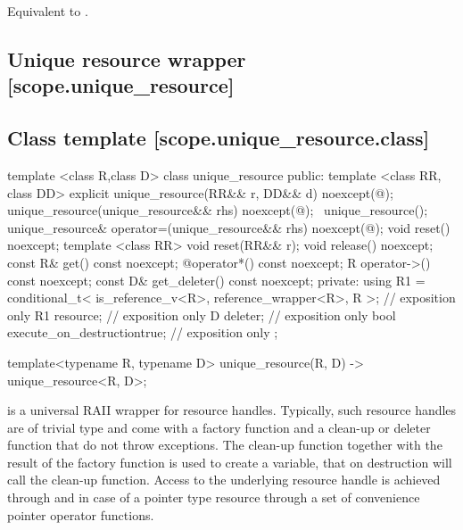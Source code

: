 \documentclass[ebook,11pt,article]{memoir}
\begin{document}
\begin{itemdescr}
\pnum
\effects
Equivalent to
.
\end{itemdescr}


\newpage

\subsection{Unique resource wrapper [scope.unique_resource]}

\subsection {Class template  [scope.unique_resource.class]}

\begin{codeblock}
template <class R,class D>
class unique_resource {
public:
  template <class RR, class DD>
    explicit 
    unique_resource(RR&& r, DD&& d) noexcept(@\seebelow@);
  unique_resource(unique_resource&& rhs) noexcept(@\seebelow@);
  ~unique_resource();
  unique_resource& operator=(unique_resource&& rhs) noexcept(@\seebelow@);
  void reset() noexcept;
  template <class RR>
    void reset(RR&& r);
  void release() noexcept;
  const R& get() const noexcept;
  @\seebelow@ operator*() const noexcept;
  R operator->() const noexcept;  
  const D& get_deleter() const noexcept;
private:
  using R1 = conditional_t< is_reference_v<R>, reference_wrapper<R>, R >; // exposition only
  R1   resource; // exposition only
  D    deleter;  // exposition only
  bool execute_on_destruction{true}; // exposition only
};

template<typename R, typename D>
  unique_resource(R, D) 
    -> unique_resource<R, D>;
\end{codeblock}

\pnum
\begin{note}
 is a universal RAII wrapper for resource handles.
Typically, such resource handles are of trivial type and come with a factory function and a clean-up or deleter function that do not throw exceptions.
The clean-up function together with the result of the factory function is used to create a  variable, that on destruction will call the clean-up function. Access to the underlying resource handle is achieved through  and in case of a pointer type resource through a set of convenience pointer operator functions.
\end{note}
\end{document}
